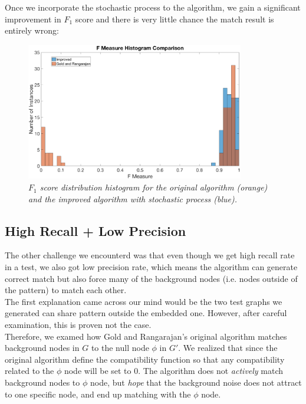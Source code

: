 Once we incorporate the stochastic process to the algorithm, we gain a significant improvement in $F_1$ score and there is very little chance the match result is entirely wrong:

\begin{figure}[h]
	\centering
	\captionsetup{justification=centering}
	\includegraphics[width=0.85\textwidth]{figs/s_improved.png}
	\caption[Caption for LOF]{\emph{$F_1$ score distribution histogram for the original algorithm (orange) and the improved algorithm with stochastic process (blue).}}
	\label{fig:s_improved}
\end{figure}

\subsection{High Recall + Low Precision}
\label{ssec:nullnode}

The other challenge we encounterd was that even though we get high recall rate in a test, we also got low precision rate, which means the algorithm can generate correct match but also force many of the background nodes (i.e. nodes outside of the pattern) to match each other.\\

The first explanation came across our mind would be the two test graphs we generated can share pattern outside the embedded one. However, after careful examination, this is proven not the case.\\

Therefore, we examed how Gold and Rangarajan's original algorithm matches background nodes in $G$ to the null node $\phi$ in $G'$. We realized that since the original algorithm define the compatibility function so that any compatibility related to the $\phi$ node will be set to 0. The algorithm does not \emph{actively} match background nodes to  $\phi$ node, but \emph{hope} that the background noise does not attract to one specific node, and end up matching with the $\phi$ node.\\

